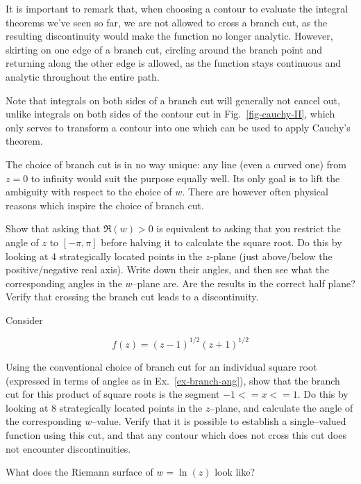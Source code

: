 It is important to remark that, when choosing a contour to evaluate the integral theorems we've seen so far, we are not allowed to cross a branch cut, as the resulting discontinuity would make the function no longer analytic. However, skirting on one edge of a branch cut, circling around the branch point and returning along the other edge is allowed, as the function stays continuous and analytic throughout the entire path. 

Note that integrals on both sides of a branch cut will generally not cancel out, unlike integrals on both sides of the contour cut in Fig.~\ref{fig-cauchy-II}, which only serves to transform a contour into one which can be used to apply Cauchy's theorem.

The choice of branch cut is in no way unique: any line (even a curved one) from $z=0$ to infinity would suit the purpose equally well. Its only goal is to lift the ambiguity with respect to the choice of $w$. There are however often physical reasons which inspire the choice of branch cut.

\begin{exer}
\label{ex-branch-ang}
Show that asking that $\Re(w)>0$ is equivalent to asking that you restrict the angle of $z$ to $[-\pi, \pi]$ before halving it to calculate the square root. Do this by looking at 4 strategically located points in the $z$-plane (just above/below the positive/negative real axis). Write down their angles, and then see what the corresponding angles in the $w$--plane are. Are the results in the correct half plane? Verify that crossing the branch cut leads to a discontinuity. 
\end{exer}

\begin{exer}
Consider

$$f(z)=(z-1)^{1/2}(z+1)^{1/2}$$

Using the conventional choice of branch cut for an individual square root (expressed in terms of angles as in Ex.~\ref{ex-branch-ang}), show that the branch cut for this product of square roots is the segment $-1<= x <= 1$. Do this by looking at 8 strategically located points in the $z$--plane, and calculate the angle of the corresponding $w$--value. Verify that it is possible to establish a single--valued function using this cut, and that any contour which does not cross this cut does not encounter discontinuities.
\end{exer}

\begin{exer}
What does the Riemann surface of $w=\ln(z)$ look like?
\end{exer}

